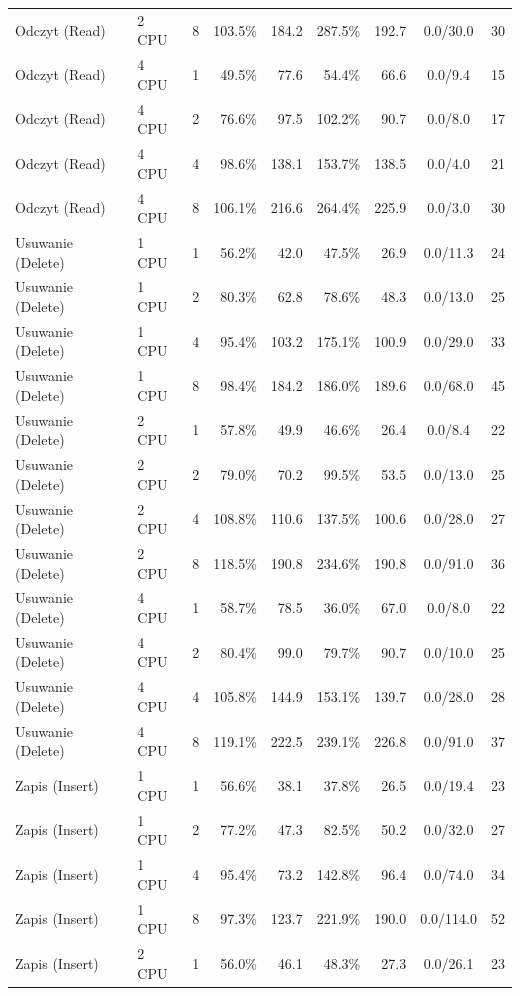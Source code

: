 \begin{table}[ht]
{\begin{tabular}{llcrrrrcc}
Odczyt (Read) & 2 CPU & 8 & 103.5\% & 184.2 & 287.5\% & 192.7 & 0.0/30.0 & 30 \\
Odczyt (Read) & 4 CPU & 1 & 49.5\% & 77.6 & 54.4\% & 66.6 & 0.0/9.4 & 15 \\
Odczyt (Read) & 4 CPU & 2 & 76.6\% & 97.5 & 102.2\% & 90.7 & 0.0/8.0 & 17 \\
Odczyt (Read) & 4 CPU & 4 & 98.6\% & 138.1 & 153.7\% & 138.5 & 0.0/4.0 & 21 \\
Odczyt (Read) & 4 CPU & 8 & 106.1\% & 216.6 & 264.4\% & 225.9 & 0.0/3.0 & 30 \\
Usuwanie (Delete) & 1 CPU & 1 & 56.2\% & 42.0 & 47.5\% & 26.9 & 0.0/11.3 & 24 \\
Usuwanie (Delete) & 1 CPU & 2 & 80.3\% & 62.8 & 78.6\% & 48.3 & 0.0/13.0 & 25 \\
Usuwanie (Delete) & 1 CPU & 4 & 95.4\% & 103.2 & 175.1\% & 100.9 & 0.0/29.0 & 33 \\
Usuwanie (Delete) & 1 CPU & 8 & 98.4\% & 184.2 & 186.0\% & 189.6 & 0.0/68.0 & 45 \\
Usuwanie (Delete) & 2 CPU & 1 & 57.8\% & 49.9 & 46.6\% & 26.4 & 0.0/8.4 & 22 \\
Usuwanie (Delete) & 2 CPU & 2 & 79.0\% & 70.2 & 99.5\% & 53.5 & 0.0/13.0 & 25 \\
Usuwanie (Delete) & 2 CPU & 4 & 108.8\% & 110.6 & 137.5\% & 100.6 & 0.0/28.0 & 27 \\
Usuwanie (Delete) & 2 CPU & 8 & 118.5\% & 190.8 & 234.6\% & 190.8 & 0.0/91.0 & 36 \\
Usuwanie (Delete) & 4 CPU & 1 & 58.7\% & 78.5 & 36.0\% & 67.0 & 0.0/8.0 & 22 \\
Usuwanie (Delete) & 4 CPU & 2 & 80.4\% & 99.0 & 79.7\% & 90.7 & 0.0/10.0 & 25 \\
Usuwanie (Delete) & 4 CPU & 4 & 105.8\% & 144.9 & 153.1\% & 139.7 & 0.0/28.0 & 28 \\
Usuwanie (Delete) & 4 CPU & 8 & 119.1\% & 222.5 & 239.1\% & 226.8 & 0.0/91.0 & 37 \\
Zapis (Insert) & 1 CPU & 1 & 56.6\% & 38.1 & 37.8\% & 26.5 & 0.0/19.4 & 23 \\
Zapis (Insert) & 1 CPU & 2 & 77.2\% & 47.3 & 82.5\% & 50.2 & 0.0/32.0 & 27 \\
Zapis (Insert) & 1 CPU & 4 & 95.4\% & 73.2 & 142.8\% & 96.4 & 0.0/74.0 & 34 \\
Zapis (Insert) & 1 CPU & 8 & 97.3\% & 123.7 & 221.9\% & 190.0 & 0.0/114.0 & 52 \\
Zapis (Insert) & 2 CPU & 1 & 56.0\% & 46.1 & 48.3\% & 27.3 & 0.0/26.1 & 23 \\

\end{tabular}}
\end{table}
